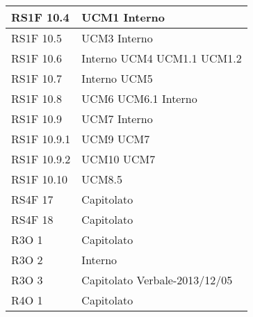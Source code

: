 \begin{center}
\begin{longtable}{ | p{5cm} | p{5cm} |}
        RS1F 10.4 &  UCM1 \newline  Interno \newline  \\ \hline      
        RS1F 10.5 &  UCM3 \newline  Interno \newline  \\ \hline      
        RS1F 10.6 &  Interno \newline  UCM4 \newline  UCM1.1 \newline  UCM1.2 \newline  \\ \hline      
        RS1F 10.7 &  Interno \newline  UCM5 \newline  \\ \hline      
        RS1F 10.8 &  UCM6 \newline  UCM6.1 \newline  Interno \newline  \\ \hline      
        RS1F 10.9 &  UCM7 \newline  Interno \newline  \\ \hline      
        RS1F 10.9.1 &  UCM9 \newline  UCM7 \newline  \\ \hline      
        RS1F 10.9.2 &  UCM10 \newline  UCM7 \newline  \\ \hline      
        RS1F 10.10 &  UCM8.5 \newline  \\ \hline      
        RS4F 17 &  Capitolato \newline  \\ \hline      
        RS4F 18 &  Capitolato \newline  \\ \hline      
        R3O 1 &  Capitolato \newline  \\ \hline      
        R3O 2 &  Interno \newline  \\ \hline      
        R3O 3 &  Capitolato \newline  Verbale-2013/12/05 \newline  \\ \hline      
        R4O 1 &  Capitolato \newline  \\ \hline      

\end{longtable}
\end{center}
